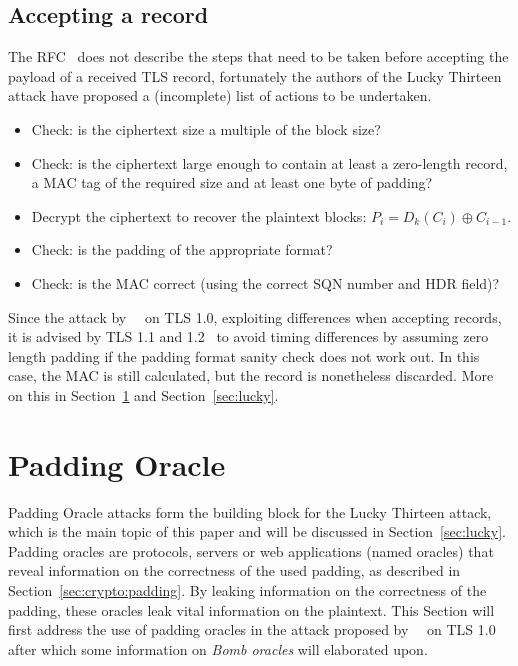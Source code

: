 \documentclass[10pt,conference,a4paper]{IEEEtran}
\begin{document}
\subsection{Accepting a record}
\label{sec:tls:accepting}
The RFC~\cite{ietf2008transport} does not describe the steps that need to be taken before accepting the payload of a received TLS record, fortunately the authors of the Lucky Thirteen attack have proposed a (incomplete) list of actions to be undertaken.
\begin{itemize}
  \item Check: is the ciphertext size a multiple of the block size?
  \item Check: is the ciphertext large enough to contain at least a zero-length record, a MAC tag of the required size and at least one byte of padding?
  \item Decrypt the ciphertext to recover the plaintext blocks: $P_i = D_k(C_i) \oplus C_{i-1}$.
  \item Check: is the padding of the appropriate format?
  \item Check: is the MAC correct (using the correct SQN number and HDR field)?
\end{itemize}
Since the attack by~\citeauthor{vaudenay2002security}~\cite{vaudenay2002security} on TLS 1.0, exploiting differences when accepting records, it is advised by TLS 1.1 and 1.2~\cite{ietf2008transport} to avoid timing differences by assuming zero length padding if the padding format sanity check does not work out. In this case, the MAC is still calculated, but the record is nonetheless discarded. More on this in Section~\ref{sec:paddingoracle} and Section~\ref{sec:lucky}.



\section{Padding Oracle}
\label{sec:paddingoracle}
Padding Oracle attacks form the building block for the Lucky Thirteen attack, which is the main topic of this paper and will be discussed in Section~\ref{sec:lucky}. Padding oracles are protocols, servers or web applications (named oracles) that reveal information on the correctness of the used padding, as described in Section~\ref{sec:crypto:padding}. By leaking information on the correctness of the padding, these oracles leak vital information on the plaintext. This Section will first address the use of padding oracles in the attack proposed by~\citeauthor{vaudenay2002security}~\cite{vaudenay2002security} on TLS 1.0~\cite{dierks1999rfc} after which some information on \textit{Bomb oracles} will elaborated upon.
\end{document}
